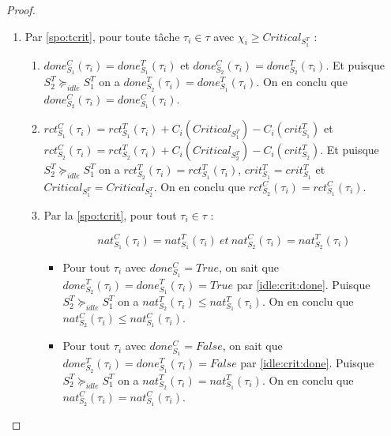 \documentclass[12pt,a4paper,oneside]{book}
\theoremstyle{break}
\theoremstyle{breakplain}
\begin{document}
\begin{proof}
\begin{enumerate}
\item Par \autoref{spo:tcrit}, pour toute tâche $\tau_i \in \tau$ avec $\chi_i \geq Critical_{S_1^T}$ :
\begin{enumerate}[label=(\alph*)]

\item \label{idle:crit:done} $done_{S_1}^C(\tau_i) = done_{S_1}^T(\tau_i)$ et $done_{S_2}^C(\tau_i) = done_{S_2}^T(\tau_i)$. Et puisque $S^T_2 \succeq_{idle} S^T_1$ on a $done_{S_2}^T(\tau_i)= done_{S_1}^T(\tau_i)$. On en conclu que $done_{S_2}^C(\tau_i) = done_{S_1}^C(\tau_i)$.


\item $rct_{S_1}^C(\tau_i) = rct_{S_1}^T(\tau_i)+C_i(Critical_{S_1^T})-C_i(crit_{S_1}^T)$ et $rct_{S_2}^C(\tau_i) = rct_{S_2}^T(\tau_i)+C_i(Critical_{S_2^T})-C_i(crit_{S_2}^T)$. Et puisque $S^T_2 \succeq_{idle} S^T_1$ on a $rct_{S_2}^T(\tau_i) = rct_{S_1}^T(\tau_i)$, $crit_{S_1}^T = crit_{S_1}^T$ et $Critical_{S_1^T} = Critical_{S_2^T}$. On en conclu que $rct_{S_2}^C(\tau_i) = rct_{S_1}^C(\tau_i)$.



\item Par la \autoref{spo:tcrit}, pour tout $\tau_i \in \tau$ :

\begin{equation}
nat_{S_1}^C(\tau_i) = nat_{S_1}^T(\tau_i)\ et\ nat_{S_2}^C(\tau_i) = nat_{S_2}^T(\tau_i)
\end{equation}

\begin{itemize}

\item Pour tout $\tau_i$ avec $done^C_{S_1} = True$, on sait que $done_{S_2}^T(\tau_i) = done_{S_1}^T(\tau_i) = True$ par \autoref{idle:crit:done}. Puisque $S^T_2 \succeq_{idle} S^T_1$ on a $nat_{S_2}^T(\tau_i)\leq nat_{S_1}^T(\tau_i)$. On en conclu que $nat_{S_2}^C(\tau_i) \leq nat_{S_1}^C(\tau_i)$.

\item Pour tout $\tau_i$ avec $done^C_{S_1} = False$, on sait que $done_{S_2}^T(\tau_i) = done_{S_1}^T(\tau_i) = False$ par \autoref{idle:crit:done}. Puisque $S^T_2 \succeq_{idle} S^T_1$ on a $nat_{S_2}^T(\tau_i) = nat_{S_1}^T(\tau_i)$. On en conclu que $nat_{S_2}^C(\tau_i) = nat_{S_1}^C(\tau_i)$.

\end{itemize}

\end{enumerate}


\end{enumerate}
\end{proof}
\end{document}
